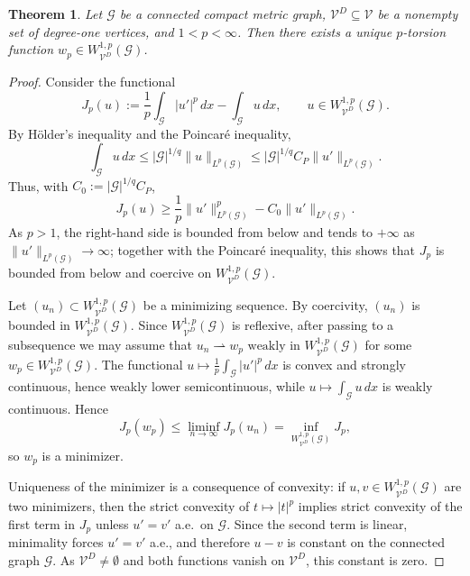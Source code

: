 \documentclass[12pt,a4paper]{article}
\numberwithin{equation}{section}
\newtheorem{theorem}{Theorem}[section]
\newcommand{\WpD}{W^{1,p}_{\mathcal{V}^D}(\mathcal G)}
\begin{document}
\begin{theorem}\label{thm:exist}
	Let $\mathcal G$ be a connected compact metric graph, 
	$\mathcal{V}^D\subseteq\mathcal{V}$ be a nonempty set of degree-one vertices, and 
	$1<p<\infty$.
	Then there exists a unique $p$-torsion function
	$w_p\in W^{1,p}_{\mathcal{V}^D}(\mathcal G)$.
\end{theorem}
\begin{proof}
	Consider the functional
	\begin{equation}\label{eq:Jp}
		J_p(u):=\frac1p\int_{\mathcal G}|u'|^p\,dx-\int_{\mathcal G}u\,dx,
		\qquad u\in\WpD .
	\end{equation}
	By H\"older's inequality and the Poincar\'e inequality,
	\[
	\int_{\mathcal G}u\,dx
	\le |\mathcal G|^{1/q}\|u\|_{L^p(\mathcal G)}
	\le |\mathcal G|^{1/q}C_P\|u'\|_{L^p(\mathcal G)} .
	\]
	Thus, with $C_0:=|\mathcal G|^{1/q}C_P$,
	\begin{equation}\label{eq:Jp_lower}
		J_p(u)\ge
		\frac1p\|u'\|_{L^p(\mathcal G)}^p
		-C_0\|u'\|_{L^p(\mathcal G)} .
	\end{equation}
	As $p>1$, the right-hand side is bounded from below and tends to
	$+\infty$ as $\|u'\|_{L^p(\mathcal G)}\to\infty$; together with the
	Poincar\'e inequality, this shows that $J_p$ is bounded from below and
	coercive on $\WpD$.
	
	Let $(u_n)\subset\WpD$ be a minimizing sequence. By coercivity, $(u_n)$ is
	bounded in $\WpD$. Since $\WpD$ is reflexive, after passing to a subsequence
	we may assume that
	\(
	u_n\rightharpoonup w_p
	\text{ weakly in }\WpD
	\)
	for some $w_p\in\WpD$. The functional
	$u\mapsto \frac1p\int_{\mathcal G}|u'|^p\,dx$ is convex and strongly
	continuous, hence weakly lower
	semicontinuous, while $u\mapsto\int_{\mathcal G}u\,dx$ is weakly continuous.
	Hence
	\[
	J_p(w_p)\le \liminf_{n\to\infty}J_p(u_n)=\inf_{\WpD}J_p,
	\]
	so $w_p$ is a minimizer.
	
	Uniqueness of the minimizer is a consequence of convexity: if
	$u,v\in\WpD$ are two minimizers, then the strict convexity of
	$t\mapsto |t|^p$ implies strict convexity of the first term in $J_p$
	unless $u'=v'$ a.e.\ on $\mathcal G$. Since the second term is linear,
	minimality forces $u'=v'$ a.e., and therefore $u-v$ is constant on the
	connected graph $\mathcal G$. As $\mathcal{V}^D\ne\emptyset$ and both
	functions vanish on $\mathcal{V}^D$, this constant is zero.
	

\end{proof}
\end{document}
